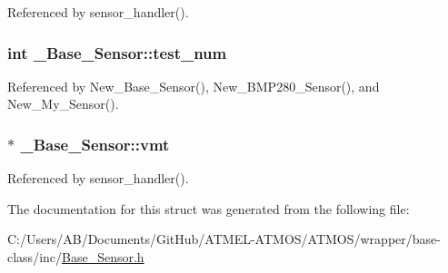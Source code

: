 Referenced by sensor\-\_\-handler().

\hypertarget{struct___base___sensor_a8867289889dfcd9c796f8051e0502dda}{
\subsubsection[{test\-\_\-num}]{\setlength{\rightskip}{0pt plus 5cm}int \-\_\-\-Base\-\_\-\-Sensor\-::test\-\_\-num}}\label{struct___base___sensor_a8867289889dfcd9c796f8051e0502dda}


Referenced by New\-\_\-\-Base\-\_\-\-Sensor(), New\-\_\-\-B\-M\-P280\-\_\-\-Sensor(), and New\-\_\-\-My\-\_\-\-Sensor().

\hypertarget{struct___base___sensor_a45814e02e1525822b3efeae0bc06cea1}{
\subsubsection[{vmt}]{$\ast$ \-\_\-\-Base\-\_\-\-Sensor\-::vmt}}\label{struct___base___sensor_a45814e02e1525822b3efeae0bc06cea1}


Referenced by sensor\-\_\-handler().



The documentation for this struct was generated from the following file\-:\begin{DoxyCompactItemize}
\item 
C\-:/\-Users/\-A\-B/\-Documents/\-Git\-Hub/\-A\-T\-M\-E\-L-\/\-A\-T\-M\-O\-S/\-A\-T\-M\-O\-S/wrapper/base-\/class/inc/\hyperlink{_base___sensor_8h}{Base\-\_\-\-Sensor.\-h}\end{DoxyCompactItemize}

